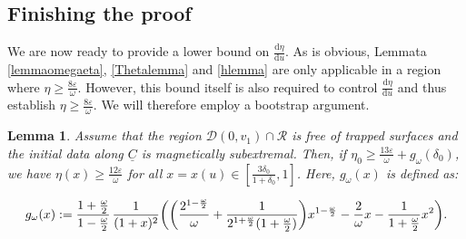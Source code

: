 \documentclass{article}[11pt]
\newcommand{\hsp}{\hspace{.5mm}}
\newcommand{\Cbar}{\underline{C}}
\newtheorem{lemma}{Lemma}[section]
\numberwithin{equation}{section}
\begin{document}
\subsection{Finishing the proof}\label{sec:trapped-surface}

We are now ready to provide a lower bound on $\frac{\text{d}\eta}{\text{d}u}$. As is obvious, Lemmata \ref{lemmaomegaeta}, \ref{Thetalemma} and \ref{hlemma} are only applicable in a region where $\eta \geq \frac{8 \varepsilon}{\omega}$. However, this bound itself is also required to control $\frac{\text{d}\eta}{\text{d}u}$ and thus establish $\eta \geq \frac{8 \varepsilon}{\omega}$. We will therefore employ a bootstrap argument. 

\begin{lemma}
Assume that the region $\mathcal{D}(0,v_1)\cap \mathcal{R}$ is free of trapped surfaces and the initial data along $\Cbar$ is magnetically subextremal. Then, if $\eta_0 \geq \frac{13\varepsilon}{\omega}+g_{\omega}(\delta_0)$, we have $\eta(x) \geq \frac{12\varepsilon}{\omega}$ for all $x= x(u)\in [\frac{3\delta_0}{1+\delta_0},1]$. Here, $g_{\omega}(x)$ is defined as:

\[ g_{\omega}(x):= \frac{1+\frac{\omega}{2}}{1-\frac{\omega}{2}} \hsp \frac{1}{(1+x)^2}\bigg(\bigg( \frac{2^{1-\frac{\omega}{2}}}{\omega}+ \frac{1}{2^{1+\frac{\omega}{2}}(1+\frac{\omega}{2})}\bigg)x^{1-\frac{\omega}{2}}-\frac{2}{\omega}x-\frac{1}{1+\frac{\omega}{2}}x^2\bigg).    \]
\end{lemma}
\end{document}
